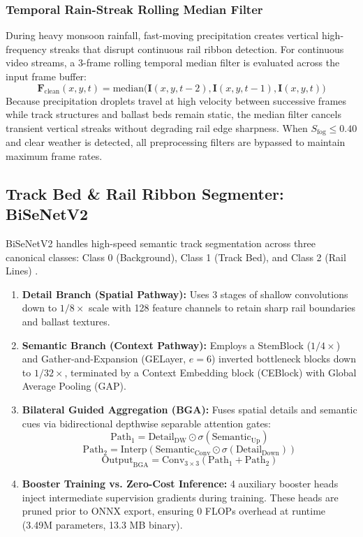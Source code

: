 \documentclass[conference]{IEEEtran}
\begin{document}
\subsubsection{Temporal Rain-Streak Rolling Median Filter}
During heavy monsoon rainfall, fast-moving precipitation creates vertical high-frequency streaks that disrupt continuous rail ribbon detection. For continuous video streams, a 3-frame rolling temporal median filter is evaluated across the input frame buffer:
\begin{equation}
\mathbf{F}_{\text{clean}}(x, y, t) = \text{median}\big(\mathbf{I}(x, y, t-2), \mathbf{I}(x, y, t-1), \mathbf{I}(x, y, t)\big)
\end{equation}
Because precipitation droplets travel at high velocity between successive frames while track structures and ballast beds remain static, the median filter cancels transient vertical streaks without degrading rail edge sharpness. When $S_{\text{fog}} \le 0.40$ and clear weather is detected, all preprocessing filters are bypassed to maintain maximum frame rates.

\subsection{Track Bed \& Rail Ribbon Segmenter: BiSeNetV2}
BiSeNetV2 handles high-speed semantic track segmentation across three canonical classes: Class 0 (Background), Class 1 (Track Bed), and Class 2 (Rail Lines) \cite{song2025deep, guo2026track2net}.
\begin{enumerate}
    \item \textbf{Detail Branch (Spatial Pathway):} Uses 3 stages of shallow convolutions down to $1/8\times$ scale with 128 feature channels to retain sharp rail boundaries and ballast textures.
    \item \textbf{Semantic Branch (Context Pathway):} Employs a StemBlock ($1/4\times$) and Gather-and-Expansion (GELayer, $e=6$) inverted bottleneck blocks down to $1/32\times$, terminated by a Context Embedding block (CEBlock) with Global Average Pooling (GAP).
    \item \textbf{Bilateral Guided Aggregation (BGA):} Fuses spatial details and semantic cues via bidirectional depthwise separable attention gates:
    \begin{equation}
    \text{Path}_1 = \text{Detail}_{\text{DW}} \odot \sigma(\text{Semantic}_{\text{Up}})
    \end{equation}
    \begin{equation}
    \text{Path}_2 = \text{Interp}\left(\text{Semantic}_{\text{Conv}} \odot \sigma(\text{Detail}_{\text{Down}})\right)
    \end{equation}
    \begin{equation}
    \text{Output}_{\text{BGA}} = \text{Conv}_{3\times3}\left(\text{Path}_1 + \text{Path}_2\right)
    \end{equation}
    \item \textbf{Booster Training vs. Zero-Cost Inference:} 4 auxiliary booster heads inject intermediate supervision gradients during training. These heads are pruned prior to ONNX export, ensuring 0 FLOPs overhead at runtime (3.49M parameters, 13.3 MB binary).
\end{enumerate}
\end{document}
